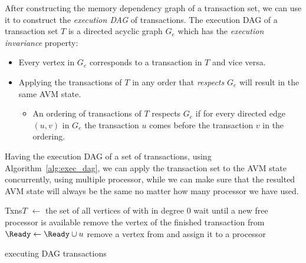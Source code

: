 \documentclass[11pt, A4]{report}
\begin{document}
    After constructing the memory dependency graph of a transaction set, we can use it to construct the
    \emph{execution DAG} of transactions. The execution DAG of a transaction set \(T\) is a directed acyclic
    graph \(G_e\) which has the \emph{execution invariance} property:
    \begin{itemize}
        \item Every vertex in \(G_e\) corresponds to a transaction in \(T\) and vice versa.
        \item Applying the transactions of \(T\) in any order that \emph{respects} \(G_e\) will result in
        the same AVM state.
        \begin{itemize}
            \item An ordering of transactions of \(T\) respects \(G_e\) if for every directed edge \((u,v)\) in \(G_e\)
            the transaction \(u\) comes before the transaction \(v\) in the ordering.
        \end{itemize}
    \end{itemize}

    Having the execution DAG of a set of transactions, using Algorithm~\ref{alg:exec_dag}, we can apply the transaction
    set to the AVM state concurrently, using multiple processor, while we can make sure that the resulted AVM state will
    always be the same no matter how many processor we have used.

    \begin{algorithm}
        \DontPrintSemicolon
        \SetKwData
        {Txns}{$T$}
        \BlankLine
        \Ready $\gets$ the set of all vertices of \Vertices with in degree 0\;
        \While{$\Vertices \neq \varnothing$}
        {
            wait until a new free processor is available\;
            {
                remove the vertex of the finished transaction \V from \Graph\;
                {
                    {
                        $\Ready \gets \Ready \cup u$\;
                    }
                }
            }
            \If{$\Ready \neq \varnothing$}
            {
                remove a vertex from \Ready and assign it to a processor\;
            }
        }
        \caption{executing DAG transactions}\label{alg:exec_dag}
    \end{algorithm}
\end{document}
